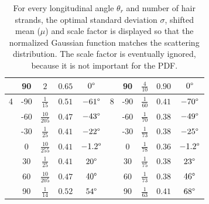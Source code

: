 \documentclass[11pt,a4paper]{report}
\begin{document}
\begin{table}[h]
\begin{center}
\begin{tabular}{|cc|c|c|c||cc|c|c|c|}
  & 90 & $2$ & $0.65$ & $0 \degree$ 					&  & 90 & $\frac{4}{10}$ & $0.90$ & $0\degree$ \\ \hline
4  & -90 & $\frac{1}{15}$ & $0.51$ & $-61 \degree$					& 8 & -90 & $\frac{1}{60}$ & $0.41$ & $-70\degree$ \\
  & -60 & $\frac{10}{205}$ & $0.47$ & $-43 \degree$ 	&  & -60 & $\frac{1}{70}$ & $0.38$ & $-49\degree$ \\
  & -30 & $\frac{1}{25}$ & $0.41$ & $-22 \degree$ 		&  & -30 & $\frac{1}{73}$ & $0.38$ & $-25\degree$ \\
 & 0 & $\frac{10}{255}$ & $0.41$ & $-1.2\degree$ 			& & 0 & $\frac{1}{78}$ & $0.36$ & $-1.2\degree$ \\
 & 30 & $\frac{1}{25}$ & $0.41$ & $20 \degree$ 			&  & 30 & $\frac{1}{75}$ & $0.38$ & $23\degree$ \\
 & 60 & $\frac{10}{205}$ & $0.47$ & $40 \degree$ 		&  & 60 & $\frac{1}{73}$ & $0.38$ & $46\degree$ \\
 & 90 & $\frac{1}{14}$ & $0.52$ & $54 \degree$ 					&  & 90 & $\frac{1}{63}$ & $0.41$ & $68\degree$ \\ \hline
\end{tabular}
\caption{For every longitudinal angle $\theta_r$ and number of hair strands, the optimal standard deviation $\sigma$, shifted mean ($\mu$) and scale factor is displayed so that the normalized Gaussian function matches the scattering distribution. The scale factor is eventually ignored, because it is not important for the PDF.}
\label{optimal_values}
\end{center}
\end{table}
\end{document}
